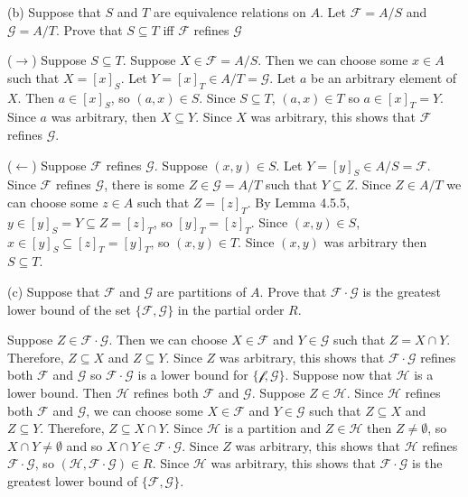 \documentclass[11pt]{article}
\newcommand{\family}[1]{\mathcal{#1}}
\begin{document}
\noindent (b) Suppose that $S$ and $T$ are equivalence relations on $A$. Let 
$\family{F} = A/S$ and $\family{G} = A/T$. Prove that $S \subseteq T$ iff 
$\family{F}$ refines $\family{G}$

($\rightarrow$) Suppose $S \subseteq T$. Suppose $X \in \family{F} = A/S$.
Then we can choose some $x \in A$ such that $X = [x]_S$. Let 
$Y = [x]_T \in A/T = \family{G}$. Let $a$ be an arbitrary element of $X$. Then 
$a \in [x]_S$, so $(a,x) \in S$. Since $S \subseteq T$, $(a,x) \in T$ so 
$a \in [x]_T = Y$. Since $a$ was arbitrary, then $X \subseteq Y$. Since $X$ was 
arbitrary, this shows that $\family{F}$ refines $\family{G}$.

($\leftarrow$) Suppose $\family{F}$ refines $\family{G}$. Suppose $(x,y) \in S$.
Let $Y = [y]_S \in A/S = \family{F}$. Since $\family{F}$ refines $\family{G}$,
there is some $Z \in \family{G} = A/T$ such that $Y \subseteq Z$. Since 
$Z \in A/T$ we can choose some $z \in A$ such that $Z = [z]_T$. By Lemma 
4.5.5, $y \in [y]_S = Y \subseteq Z = [z]_T$, so $[y]_T = [z]_T$. Since 
$(x,y) \in S$, $x \in [y]_S \subseteq [z]_T = [y]_T$, so $(x,y) \in T$.
Since $(x,y)$ was arbitrary then $S \subseteq T$.

\noindent (c) Suppose that $\family{F}$ and $\family{G}$ are partitions of $A$.
Prove that $\family{F} \cdot \family{G}$ is the greatest lower bound of the set 
$\{\family{F}, \family{G}\}$ in the partial order $R$.

Suppose $Z \in \family{F} \cdot \family{G}$. Then we can choose $X \in \family{F}$
and $Y \in \family{G}$ such that $Z = X \cap Y$. Therefore, $Z \subseteq X$ and
$Z \subseteq Y$. Since $Z$ was arbitrary, this shows that 
$\family{F} \cdot \family{G}$ refines both $\family{F}$ and $\family{G}$
so $\family{F} \cdot \family{G}$ is a lower bound for $\{\family{f}, \family{G}\}$.
Suppose now that $\family{H}$ is a lower bound. Then $\family{H}$ refines both 
$\family{F}$ and $\family{G}$. Suppose $Z \in \family{H}$. Since $\family{H}$
refines both $\family{F}$ and $\family{G}$, we can choose some $X \in \family{F}$
and $Y \in \family{G}$ such that $Z \subseteq X$ and $Z \subseteq Y$.
Therefore, $Z \subseteq X \cap Y$. Since $\family{H}$ is a partition and 
$Z \in \family{H}$ then $Z \neq \emptyset$, so $X \cap Y \neq \emptyset$
and so $X \cap Y \in \family{F} \cdot \family{G}$. Since $Z$ was arbitrary,
this shows that $\family{H}$ refines $\family{F} \cdot \family{G}$, so 
$(\family{H}, \family{F} \cdot \family{G}) \in R$. Since $\family{H}$ was arbitrary,
this shows that $\family{F} \cdot \family{G}$ is the greatest lower bound of 
$\{\family{F}, \family{G}\}$.
\end{document}
